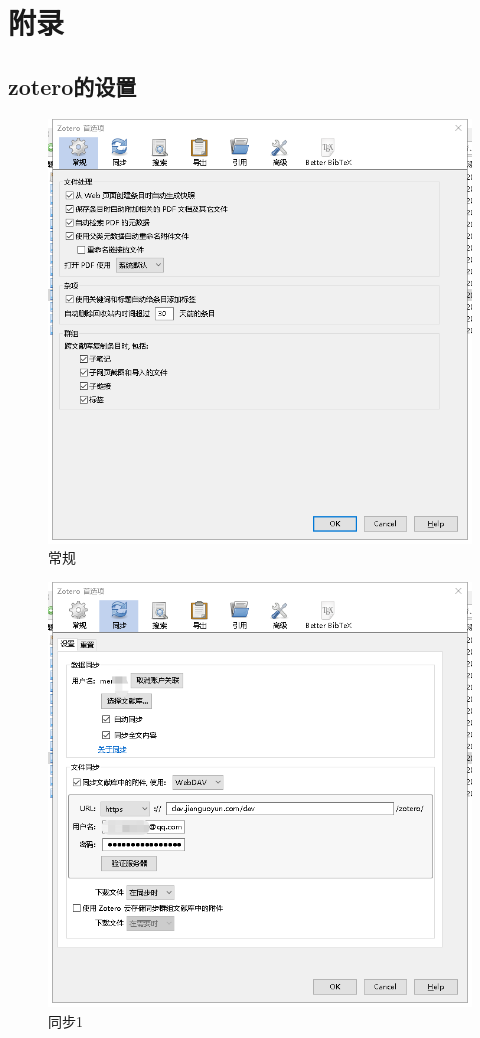 \chapter{附\texorpdfstring{\quad}{}录}
\renewcommand{\thesection}{{附录}\arabic{section}}
\setcounter{section}{0}
\section{zotero的设置}
\begin{figure}
	\centering
	\includegraphics[scale=0.8]{Fig/zotero1.png}
	\caption{\label{op1}常规}
\end{figure}
\begin{figure}
	\centering
	\includegraphics[scale=0.8]{Fig/zotero2.png}
	\caption{\label{op2}同步1}
\end{figure}
